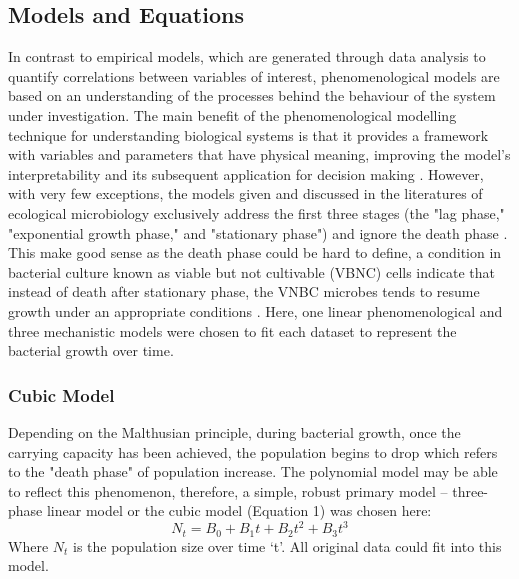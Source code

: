 \documentclass[a4paper]{report}
\begin{document}
\begin{linenumbers}
        \subsection{Models and Equations}
        In contrast to empirical models, which are generated through data analysis to quantify correlations between variables of interest, phenomenological models are based on an understanding of the processes behind the behaviour of the system under investigation. The main benefit of the phenomenological modelling technique for understanding biological systems is that it provides a framework with variables and parameters that have physical meaning, improving the model's interpretability and its subsequent application for decision making \citep{lema2018parameter}. However, with very few exceptions, the models given and discussed in the literatures of ecological microbiology exclusively address the first three stages (the "lag phase," "exponential growth phase," and "stationary phase") and ignore the death phase \citep{peleg2011microbial}. This make good sense as the death phase could be hard to define, a condition in bacterial culture known as viable but not cultivable (VBNC) cells indicate that instead of death after stationary phase, the VNBC microbes tends to resume growth  under an appropriate conditions \citep{1114732503}. Here, one linear phenomenological and three mechanistic models were chosen to fit each dataset to represent the bacterial growth over time. 

        \subsubsection{Cubic Model}
        Depending on the Malthusian principle, during bacterial growth, once the carrying capacity has been achieved, the population begins to drop which refers to the "death phase" of population increase. The polynomial model may be able to reflect this phenomenon, therefore, a simple, robust primary model \citep{article} -- three-phase linear model or the cubic model (Equation 1) was chosen here:
        \begin{equation}
                N_t = B_0 + B_1 t + B_2 t^2 + B_3 t^3
                \label{eq:cubic}
        \end{equation}
        Where $N_t$ is the population size over time ‘t'. All original data could fit into this model.


\end{linenumbers}
\end{document}
